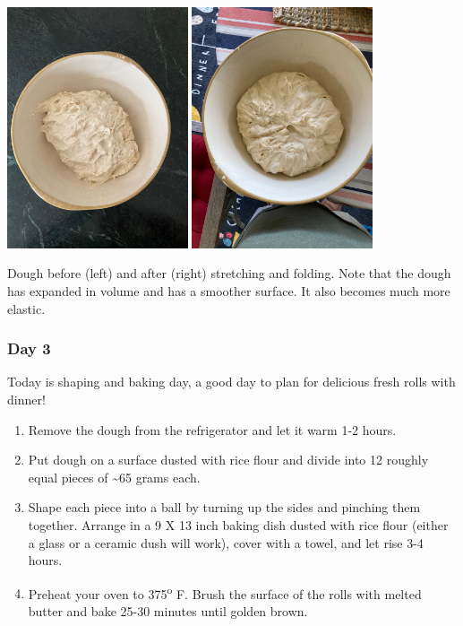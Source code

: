 \documentclass[
]{book}
\providecommand{\tightlist}{%
  \setlength{\itemsep}{0pt}\setlength{\parskip}{0pt}}
\begin{document}
\includegraphics[width=0.4\textwidth,height=\textheight]{images/drolls2.jpeg}
\includegraphics[width=0.4\textwidth,height=\textheight]{images/drolls3.jpeg}

Dough before (left) and after (right) stretching and folding. Note that the dough has expanded in volume and has a smoother surface. It also becomes much more elastic.

\hypertarget{day-3}{%
\subsubsection{Day 3}\label{day-3}}

Today is shaping and baking day, a good day to plan for delicious fresh rolls with dinner!

\begin{enumerate}
\def\labelenumi{\arabic{enumi}.}
\tightlist
\item
  Remove the dough from the refrigerator and let it warm 1-2 hours.
\item
  Put dough on a surface dusted with rice flour and divide into 12 roughly equal pieces of \textasciitilde65 grams each.
\item
  Shape each piece into a ball by turning up the sides and pinching them together. Arrange in a 9 X 13 inch baking dish dusted with rice flour (either a glass or a ceramic dush will work), cover with a towel, and let rise 3-4 hours.
\item
  Preheat your oven to 375\textsuperscript{o} F. Brush the surface of the rolls with melted butter and bake 25-30 minutes until golden brown.
\end{enumerate}
\end{document}
